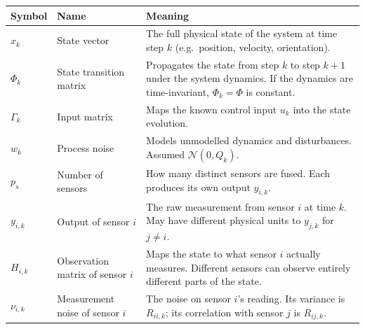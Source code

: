 \documentclass[12pt, a4paper]{article}
\begin{document}
\begin{center}
\begin{tabular}{@{} l p{3.2cm} p{7.8cm} @{}}
  \toprule
  Symbol & Name & Meaning \\
  \midrule
  $x_k$ & State vector &
    The full physical state of the system at time step $k$
    (e.g.\ position, velocity, orientation). \\[3pt]
  $\Phi_k$ & State transition matrix &
    Propagates the state from step $k$ to step $k{+}1$ under the system
    dynamics.  If the dynamics are time-invariant, $\Phi_k = \Phi$ is
    constant. \\[3pt]
  $\Gamma_k$ & Input matrix &
    Maps the known control input $u_k$ into the state evolution. \\[3pt]
  $w_k$ & Process noise &
    Models unmodelled dynamics and disturbances.
    Assumed $\mathcal{N}(0, Q_k)$. \\[3pt]
  $p_s$ & Number of sensors &
    How many distinct sensors are fused.
    Each produces its own output $y_{i,k}$. \\[3pt]
  $y_{i,k}$ & Output of sensor $i$ &
    The raw measurement from sensor $i$ at time $k$.
    May have different physical units to $y_{j,k}$ for $j \neq i$. \\[3pt]
  $H_{i,k}$ & Observation matrix of sensor $i$ &
    Maps the state to what sensor $i$ actually measures.
    Different sensors can observe entirely different parts of the state. \\[3pt]
  $\nu_{i,k}$ & Measurement noise of sensor $i$ &
    The noise on sensor $i$'s reading.
    Its variance is $R_{ii,k}$; its correlation with sensor $j$ is
    $R_{ij,k}$. \\
  \bottomrule
\end{tabular}
\end{center}
\end{document}
